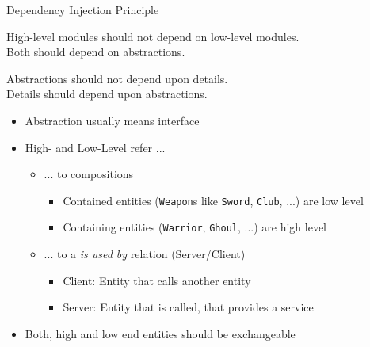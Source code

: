 \begin{frame}{Dependency Injection Principle}
%
\vspace{-6pt}
\begin{defbox}[Definition]
\small
High-level modules should not depend on low-level modules.\\
Both should depend on abstractions.

\vspace{3pt}
Abstractions should not depend upon details.\\
Details should depend upon abstractions.
\end{defbox}
%
\vspace{-6pt}
\begin{itemize}
\item Abstraction usually means interface
\item High- and Low-Level refer ...
	\begin{itemize}
	\item ... to compositions
		\begin{itemize}
		\item Contained entities (\zB \texttt{Weapon}s like \texttt{Sword}, \texttt{Club}, ...) are low level
		\item Containing entities (\zB \texttt{Warrior}, \texttt{Ghoul}, ...) are high level
		\end{itemize}
	\item ... to a \emph{is used by} relation (Server/Client)
		\begin{itemize}
		\item Client: Entity that calls another entity
		\item Server: Entity that is called, that provides a service
		\end{itemize}
	\end{itemize}
\item[\Thus] Both, high and low end entities should be exchangeable
\end{itemize}
%
\end{frame}


